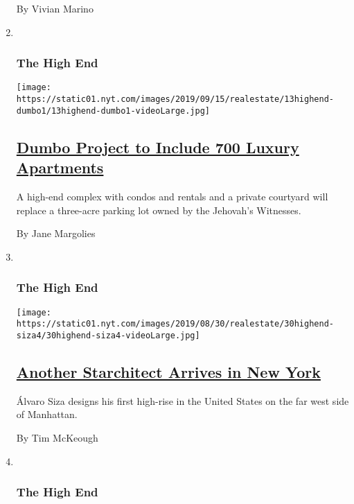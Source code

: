 \begin{enumerate}
  By Vivian Marino
\item ~
  \hypertarget{the-high-end-1}{%
  \subsubsection{The High End}\label{the-high-end-1}}

  \texttt{[image: https://static01.nyt.com/images/2019/09/15/realestate/13highend-dumbo1/13highend-dumbo1-videoLarge.jpg]}

  \hypertarget{dumbo-project-to-include-700-luxury-apartments}{%
  \subsection{\texorpdfstring{\href{/2019/09/13/realestate/dumbo-brooklyn-condos-on-former-jehovahs-witness-parking-lot.html}{Dumbo
  Project to Include 700 Luxury
  Apartments}}{Dumbo Project to Include 700 Luxury Apartments}}\label{dumbo-project-to-include-700-luxury-apartments}}

  A high-end complex with condos and rentals and a private courtyard
  will replace a three-acre parking lot owned by the Jehovah's
  Witnesses.

  By Jane Margolies
\item ~
  \hypertarget{the-high-end-2}{%
  \subsubsection{The High End}\label{the-high-end-2}}

  \texttt{[image: https://static01.nyt.com/images/2019/08/30/realestate/30highend-siza4/30highend-siza4-videoLarge.jpg]}

  \hypertarget{another-starchitect-arrives-in-new-york}{%
  \subsection{\texorpdfstring{\href{/2019/08/30/realestate/another-starchitect-arrives-in-new-york.html}{Another
  Starchitect Arrives in New
  York}}{Another Starchitect Arrives in New York}}\label{another-starchitect-arrives-in-new-york}}

  Álvaro Siza designs his first high-rise in the United States on the
  far west side of Manhattan.

  By Tim McKeough
\item ~
  \hypertarget{the-high-end-3}{%
  \subsubsection{The High End}\label{the-high-end-3}}


\end{enumerate}
